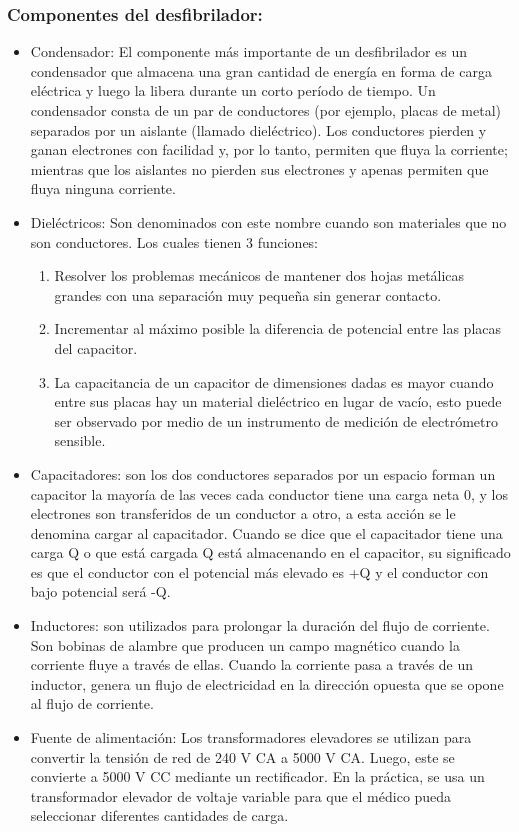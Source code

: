 \subsubsection{Componentes del desfibrilador:}
\begin{itemize}
    \item Condensador: El componente más importante de un desfibrilador es un condensador que almacena una gran cantidad de energía en forma de carga eléctrica y luego la libera durante un corto período de tiempo. Un condensador consta de un par de conductores (por ejemplo, placas de metal) separados por un aislante (llamado dieléctrico). Los conductores pierden y ganan electrones con facilidad y, por lo tanto, permiten que fluya la corriente; mientras que los aislantes no pierden sus electrones y apenas permiten que fluya ninguna corriente.
    \item Dieléctricos: Son denominados con este nombre cuando son materiales que no son conductores. Los cuales tienen 3 funciones:
    \begin{enumerate}
        \item Resolver los problemas mecánicos de mantener dos hojas metálicas grandes con una separación muy pequeña sin generar contacto.
        \item Incrementar al máximo posible la diferencia de potencial entre las placas del capacitor.
        \item La capacitancia de un capacitor de dimensiones dadas es mayor cuando entre sus placas hay un material dieléctrico en lugar de vacío, esto puede ser observado por medio de un instrumento de medición de electrómetro sensible.
    \end{enumerate}
    \item Capacitadores: son los dos conductores separados por un espacio forman un capacitor la mayoría de las veces cada conductor tiene una carga neta 0, y los electrones son transferidos de un conductor a otro, a esta acción se le denomina cargar al capacitador. Cuando se dice que el capacitador tiene una carga Q o que está cargada Q está almacenando en el capacitor, su significado es que el conductor con el potencial más elevado es +Q y el conductor con bajo potencial será -Q.
    \item Inductores: son utilizados para prolongar la duración del flujo de corriente. Son bobinas de alambre que producen un campo magnético cuando la corriente fluye a través de ellas. Cuando la corriente pasa a través de un inductor, genera un flujo de electricidad en la dirección opuesta que se opone al flujo de corriente.
    \item Fuente de alimentación: Los transformadores elevadores se utilizan para convertir la tensión de red de 240 V CA a 5000 V CA. Luego, este se convierte a 5000 V CC mediante un rectificador. En la práctica, se usa un transformador elevador de voltaje variable para que el médico pueda seleccionar diferentes cantidades de carga.
\end{itemize}

